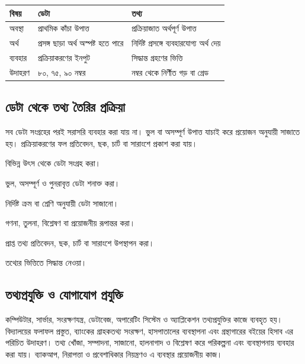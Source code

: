 \begin{topicbody}
\begin{compacttable}
\begin{tabular}{|p{}|p{}|p{}|}
\hline
\textbf{বিষয়} & \textbf{ডেটা} & \textbf{তথ্য}\\\hline
অবস্থা & প্রাথমিক কাঁচা উপাত্ত & প্রক্রিয়াজাত অর্থপূর্ণ উপাত্ত\\\hline
অর্থ & প্রসঙ্গ ছাড়া অর্থ অস্পষ্ট হতে পারে & নির্দিষ্ট প্রসঙ্গে ব্যবহারযোগ্য অর্থ দেয়\\\hline
ব্যবহার & প্রক্রিয়াকরণের ইনপুট & সিদ্ধান্ত গ্রহণের ভিত্তি\\\hline
উদাহরণ & ৮০, ৭৫, ৯০ নম্বর & নম্বর থেকে নির্ণীত গড় বা গ্রেড\\\hline
\end{tabular}
\end{compacttable}

\subsection{ডেটা থেকে তথ্য তৈরির প্রক্রিয়া}
সব ডেটা সংগ্রহের পরই সরাসরি ব্যবহার করা যায় না। ভুল বা অসম্পূর্ণ উপাত্ত যাচাই করে প্রয়োজন অনুযায়ী সাজাতে হয়। প্রক্রিয়াকরণের ফল প্রতিবেদন, ছক, চার্ট বা সারাংশে প্রকাশ করা যায়।
\begin{compactenum}
\item বিভিন্ন উৎস থেকে ডেটা সংগ্রহ করা।
\item ভুল, অসম্পূর্ণ ও পুনরাবৃত্ত ডেটা শনাক্ত করা।
\item নির্দিষ্ট ক্রম বা শ্রেণি অনুযায়ী ডেটা সাজানো।
\item গণনা, তুলনা, বিশ্লেষণ বা প্রয়োজনীয় রূপান্তর করা।
\item প্রাপ্ত তথ্য প্রতিবেদন, ছক, চার্ট বা সারাংশে উপস্থাপন করা।
\item তথ্যের ভিত্তিতে সিদ্ধান্ত নেওয়া।
\end{compactenum}

\subsection{তথ্যপ্রযুক্তি ও যোগাযোগ প্রযুক্তি}
\label{sec:ch1-ict-definition}
কম্পিউটার, সার্ভার, সংরক্ষণযন্ত্র, ডেটাবেজ, অপারেটিং সিস্টেম ও অ্যাপ্লিকেশন তথ্যপ্রযুক্তির কাজে ব্যবহৃত হয়। বিদ্যালয়ের ফলাফল প্রস্তুত, ব্যাংকের গ্রাহকতথ্য সংরক্ষণ, হাসপাতালের ব্যবস্থাপনা এবং গ্রন্থাগারের বইয়ের হিসাব এর পরিচিত উদাহরণ। তথ্য খোঁজা, সম্পাদনা, সাজানো, হালনাগাদ ও বিশ্লেষণ করে পরিকল্পনা এবং ব্যবস্থাপনায় ব্যবহার করা যায়। ব্যাকআপ, নিরাপত্তা ও প্রবেশাধিকার নিয়ন্ত্রণও এ ব্যবস্থার প্রয়োজনীয় কাজ।


\end{topicbody}
